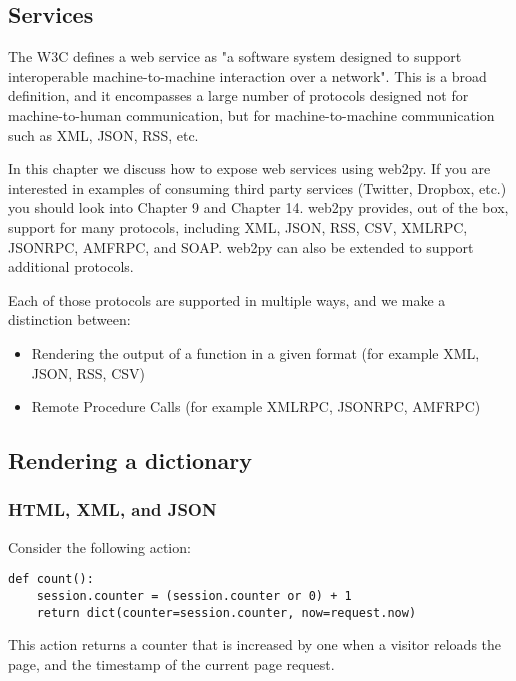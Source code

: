 \documentclass[justified,sixbynine,notoc]{tufte-book}
\def\inxx#1{\index{#1}}
\begin{document}
\begin{fullwidth}
\goodbreak\chapter{Services}

\inxx{Web Services} \inxx{API}

The W3C defines a web service as "a software system designed to support interoperable machine-to-machine interaction over a network". This is a broad definition, and it encompasses a large number of protocols designed not for machine-to-human communication, but for machine-to-machine communication such as XML, JSON, RSS, etc.

In this chapter we discuss how to expose web services using web2py. If you are interested in examples of consuming third party services (Twitter, Dropbox, etc.) you should look into Chapter 9 and Chapter 14.
\noindent web2py provides, out of the box, support for many protocols, including XML, JSON, RSS, CSV, XMLRPC, JSONRPC, AMFRPC, and SOAP. web2py can also be extended to support additional protocols.

Each of those protocols are supported in multiple ways, and we make a distinction between:
\begin{itemize}
\item Rendering the output of a function in a given format (for example XML, JSON, RSS, CSV)

\item Remote Procedure Calls (for example XMLRPC, JSONRPC, AMFRPC)
\end{itemize}

\goodbreak\section{Rendering a dictionary}

\goodbreak\subsection{HTML, XML, and JSON}

\inxx{HTML} \inxx{XML} \inxx{JSON}

Consider the following action:
\begin{lstlisting}
def count():
    session.counter = (session.counter or 0) + 1
    return dict(counter=session.counter, now=request.now)
\end{lstlisting}

This action returns a counter that is increased by one when a visitor reloads the page, and the timestamp of the current page request.


\end{fullwidth}
\end{document}
